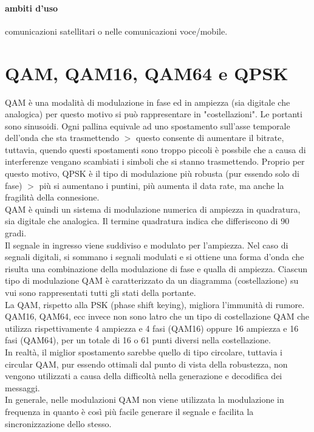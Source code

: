 \documentclass{article}
\begin{document}
\paragraph{ambiti d'uso} comunicazioni satellitari o nelle comunicazioni
voce/mobile.

\section{QAM, QAM16, QAM64 e QPSK}

QAM è una modalità di modulazione in fase ed in ampiezza (sia digitale che
analogica) per questo motivo si può rappresentare in "costellazioni". Le
portanti sono sinusoidi. Ogni pallina equivale ad uno spostamento sull'asse
temporale dell'onda che sta trasmettendo $>$ questo consente di aumentare il
bitrate, tuttavia, quendo questi spostamenti sono troppo piccoli è possbile che
a causa di interferenze vengano scambiati i simboli che si stanno trasmettendo.
Proprio per questo motivo, QPSK è il tipo di modulazione più robusta (pur
essendo solo di fase) $>$ più si aumentano i puntini, più aumenta il data rate,
ma anche la fragilità della connesione.\\
QAM è quindi un sistema di modulazione numerica di ampiezza in quadratura, sia
digitale che analogica. Il termine quadratura indica che differiscono di 90
gradi.\\
Il segnale in ingresso viene suddiviso e modulato per l'ampiezza. Nel caso di
segnali digitali, si sommano i segnali modulati e si ottiene una forma d'onda
che risulta una combinazione della modulazione di fase e qualla di ampiezza.
Ciascun tipo di modulazione QAM è caratterizzato da un diagramma (costellazione)
su vui sono rappresentati tutti gli stati della portante.\\
La QAM, rispetto alla PSK (phase shift keying), migliora l'immunità di rumore.\\
QAM16, QAM64, ecc invece non sono latro che un tipo di costellazione QAM che
utilizza rispettivamente 4 ampiezza e 4 fasi (QAM16) oppure 16 ampiezza e 16
fasi (QAM64), per un totale di 16 o 61 punti diversi nella costellazione.\\
In realtà, il miglior spostamento sarebbe quello di tipo circolare, tuttavia i
circular QAM, pur essendo ottimali dal punto di vista della robustezza, non
vengono utilizzati a causa della difficoltà nella generazione e decodifica dei
messaggi.\\
In generale, nelle modulazioni QAM non viene utilizzata la modulazione in
frequenza in quanto è così più facile generare il segnale e facilita la
sincronizzazione dello stesso.
\end{document}
